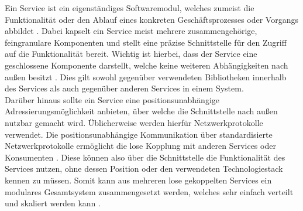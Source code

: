 Ein Service ist ein eigenständiges Softwaremodul, welches zumeist die Funktionalität oder den Ablauf eines konkreten Geschäftsprozesses oder Vorgangs abbildet \cite{Rausch.26.12.2005}. Dabei kapselt ein Service meist mehrere zusammengehörige, feingranulare Komponenten und stellt eine präzise Schnittstelle für den Zugriff auf die Funktionalität bereit.
Wichtig ist hierbei, dass der Service eine geschlossene Komponente darstellt, welche keine weiteren Abhängigkeiten nach außen besitzt \cite{SANDERS.2008}. Dies gilt sowohl gegenüber verwendeten Bibliotheken innerhalb des Services als auch gegenüber anderen Services in einem System.\\
Darüber hinaus sollte ein Service eine positionsunabhängige Adressierungsmöglichkeit anbieten, über welche die Schnittstelle nach außen nutzbar gemacht wird. Üblicherweise werden hierfür Netzwerkprotokolle verwendet. Die positionsunabhängige Kommunikation über standardisierte Netzwerkprotokolle ermöglicht die lose Kopplung mit anderen Services oder Konsumenten \cite{ANG.2006}. Diese können also über die Schnittstelle die Funktionalität des Services nutzen, ohne dessen Position oder den verwendeten Technologiestack kennen zu müssen. Somit kann aus mehreren lose gekoppelten Services ein modulares Gesamtsystem zusammengesetzt werden, welches sehr einfach verteilt und skaliert werden kann \cite{SANDERS.2008}. 

